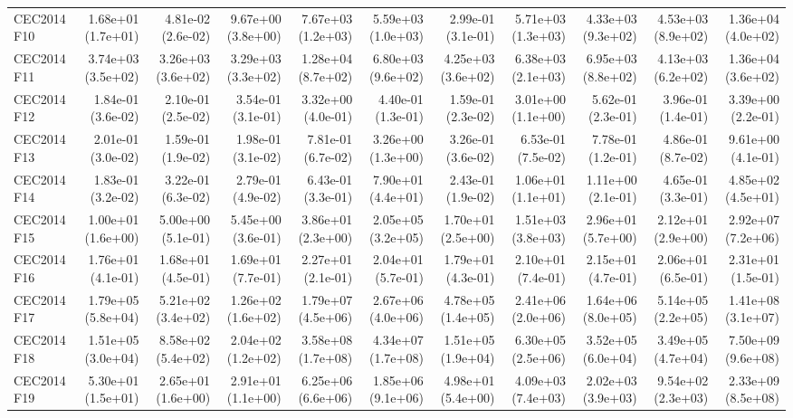 \begin{longtable}{lrrrrrrrrrr}
CEC2014 F10 & 1.68e+01 (1.7e+01) & 4.81e-02 (2.6e-02) & 9.67e+00 (3.8e+00) & 7.67e+03 (1.2e+03) & 5.59e+03 (1.0e+03) & 2.99e-01 (3.1e-01) & 5.71e+03 (1.3e+03) & 4.33e+03 (9.3e+02) & 4.53e+03 (8.9e+02) & 1.36e+04 (4.0e+02) \\
CEC2014 F11 & 3.74e+03 (3.5e+02) & 3.26e+03 (3.6e+02) & 3.29e+03 (3.3e+02) & 1.28e+04 (8.7e+02) & 6.80e+03 (9.6e+02) & 4.25e+03 (3.6e+02) & 6.38e+03 (2.1e+03) & 6.95e+03 (8.8e+02) & 4.13e+03 (6.2e+02) & 1.36e+04 (3.6e+02) \\
CEC2014 F12 & 1.84e-01 (3.6e-02) & 2.10e-01 (2.5e-02) & 3.54e-01 (3.1e-01) & 3.32e+00 (4.0e-01) & 4.40e-01 (1.3e-01) & 1.59e-01 (2.3e-02) & 3.01e+00 (1.1e+00) & 5.62e-01 (2.3e-01) & 3.96e-01 (1.4e-01) & 3.39e+00 (2.2e-01) \\
CEC2014 F13 & 2.01e-01 (3.0e-02) & 1.59e-01 (1.9e-02) & 1.98e-01 (3.1e-02) & 7.81e-01 (6.7e-02) & 3.26e+00 (1.3e+00) & 3.26e-01 (3.6e-02) & 6.53e-01 (7.5e-02) & 7.78e-01 (1.2e-01) & 4.86e-01 (8.7e-02) & 9.61e+00 (4.1e-01) \\
CEC2014 F14 & 1.83e-01 (3.2e-02) & 3.22e-01 (6.3e-02) & 2.79e-01 (4.9e-02) & 6.43e-01 (3.3e-01) & 7.90e+01 (4.4e+01) & 2.43e-01 (1.9e-02) & 1.06e+01 (1.1e+01) & 1.11e+00 (2.1e-01) & 4.65e-01 (3.3e-01) & 4.85e+02 (4.5e+01) \\
CEC2014 F15 & 1.00e+01 (1.6e+00) & 5.00e+00 (5.1e-01) & 5.45e+00 (3.6e-01) & 3.86e+01 (2.3e+00) & 2.05e+05 (3.2e+05) & 1.70e+01 (2.5e+00) & 1.51e+03 (3.8e+03) & 2.96e+01 (5.7e+00) & 2.12e+01 (2.9e+00) & 2.92e+07 (7.2e+06) \\
CEC2014 F16 & 1.76e+01 (4.1e-01) & 1.68e+01 (4.5e-01) & 1.69e+01 (7.7e-01) & 2.27e+01 (2.1e-01) & 2.04e+01 (5.7e-01) & 1.79e+01 (4.3e-01) & 2.10e+01 (7.4e-01) & 2.15e+01 (4.7e-01) & 2.06e+01 (6.5e-01) & 2.31e+01 (1.5e-01) \\
CEC2014 F17 & 1.79e+05 (5.8e+04) & 5.21e+02 (3.4e+02) & 1.26e+02 (1.6e+02) & 1.79e+07 (4.5e+06) & 2.67e+06 (4.0e+06) & 4.78e+05 (1.4e+05) & 2.41e+06 (2.0e+06) & 1.64e+06 (8.0e+05) & 5.14e+05 (2.2e+05) & 1.41e+08 (3.1e+07) \\
CEC2014 F18 & 1.51e+05 (3.0e+04) & 8.58e+02 (5.4e+02) & 2.04e+02 (1.2e+02) & 3.58e+08 (1.7e+08) & 4.34e+07 (1.7e+08) & 1.51e+05 (1.9e+04) & 6.30e+05 (2.5e+06) & 3.52e+05 (6.0e+04) & 3.49e+05 (4.7e+04) & 7.50e+09 (9.6e+08) \\
CEC2014 F19 & 5.30e+01 (1.5e+01) & 2.65e+01 (1.6e+00) & 2.91e+01 (1.1e+00) & 6.25e+06 (6.6e+06) & 1.85e+06 (9.1e+06) & 4.98e+01 (5.4e+00) & 4.09e+03 (7.4e+03) & 2.02e+03 (3.9e+03) & 9.54e+02 (2.3e+03) & 2.33e+09 (8.5e+08) \\

\end{longtable}
